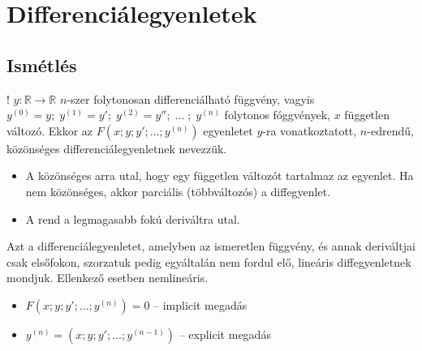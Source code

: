 \documentclass[main.tex]{subfiles}
\begin{document}
\section{Differenciálegyenletek}

\subsection{Ismétlés}


! $y : \mathbb{R} \rightarrow \mathbb{R}$ $n$-szer
folytonosan differenciálható függvény, vagyis
$y^{(0)} = y;\; y^{(1)} = y';\; y^{(2)} = y'';\; \dots \; ;\;  y^{(n)}$
folytonos fóggvények, $x$ független változó. Ekkor az
$F \left( x ; y ; y' ; \dots ; y^{(n)} \right)$
egyenletet $y$-ra vonatkoztatott, $n$-edrendű,
közönséges differenciálegyenletnek nevezzük.



\begin{itemize}
  \item A közönséges arra utal, hogy egy
        független változót tartalmaz az egyenlet.
        Ha nem közönséges, akkor parciális
        (többváltozós) a diffegyenlet.

  \item A rend a legmagasabb fokú deriváltra utal.
\end{itemize}







Azt a differenciálegyenletet, amelyben az ismeretlen
függvény, és annak deriváltjai csak elsőfokon,
szorzatuk pedig egyáltalán nem fordul elő,
lineáris diffegyenletnek mondjuk. Ellenkező
esetben nemlineáris.




\begin{itemize}
  \item $F \left( x ; y ; y' ; \dots ; y^{(n)} \right) = 0$
        \tabto{4.9cm} – \tabto{5.5cm} implicit megadás

  \item $y^{(n)} = \left( x ; y ; y' ; \dots ; y^{(n-1)} \right)$
        \tabto{4.9cm} – \tabto{5.5cm} explicit megadás
\end{itemize}
\end{document}
